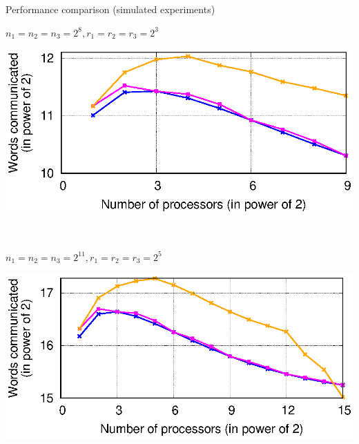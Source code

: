 \documentclass[aspectratio=169]{beamer}
\begin{document}
\begin{frame}{Performance comparison (simulated experiments)}
	\vspace*{-0.25cm}
	\begin{minipage}{0.475\linewidth}
		\begin{block}{$n_1=n_2= n_3=2^{8},r_1=r_2=r_3=2^{3}$}
			\vspace*{-0.85cm}
			\begin{center}
				\includegraphics[scale=0.56]{./A@O-vs-Seq-logscale-comparison-with-comp-8-8-8-3-3-3.eps}
			\end{center}\vspace*{-1.15cm}
		\end{block}
	\end{minipage}$\quad$
	\begin{minipage}{0.475\linewidth}
		\begin{block}{$n_1=n_2= n_3=2^{11},r_1=r_2=r_3=2^{5}$}
			\vspace*{-0.85cm}
			\begin{center}
				\includegraphics[scale=0.56]{./A@O-vs-Seq-logscale-comparison-with-comp-11-11-11-5-5-5.eps}
			\end{center}\vspace*{-1.15cm}
		\end{block}
	\end{minipage}
	

\end{frame}
\end{document}
